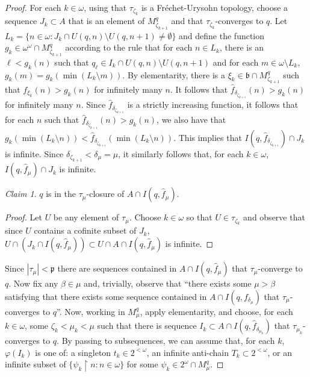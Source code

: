 \documentclass{amsart}
\theoremstyle{definition}
\theoremstyle{remark}
\newtheorem{claim}{Claim}
\begin{document}
\begin{proof}
For each $k\in\omega$, using that $\tau_{\zeta_k}$ is a
 Fr\'echet-Urysohn topology, choose a sequence $J_k\subset A$
 that is an element of $M^q_{\zeta_{k+1}}$ and that 
 $\tau_{\zeta_k}$-converges to $q$.    
Let  $L_k = \{ n\in  \omega : J_k\cap U(q,n)\setminus U(q,n+1)\neq\emptyset\}$
 and define the  function 
 $g_k\in\omega^\omega\cap M^q_{\zeta_{k+1}}$ 
 according to the rule that for each
  $n\in L_k$, 
  there is an $\ell< g_k(n)$ such
that $q_\ell \in I_k\cap U(q,n)\setminus U(q,n+1)$
and for each  $m\in\omega\setminus L_k$,
  $g_k(m) = g_k(\min(L_k\setminus m))$.  
By elementarity, there is a $\xi_k\in \mathfrak b
\cap M^q_{\zeta_{k+1}}$ such that $f_{\xi_k}(n)> g_k(n)$
for infinitely many $n$. It follows that $\hat f_{\delta_{\zeta_{k+1}}}(n)
> g_k(n)$ for infinitely many $n$. Since $\hat f_{\delta_{\zeta_{k+1}}}$ is
a strictly increasing function, it follows that for each $n$
such that $\hat f_{\delta_{\zeta_{k+1}}}(n)
> g_k(n)$, we also have that $g_k(\min(L_k\setminus n)) < 
\hat f_{\delta_{\zeta_{k+1}}}(\min(L_k\setminus n))$. 
This implies that 
$I(q,\hat f_{\delta_{\zeta_{k+1}}})\cap J_k$ is infinite.
Since $\delta_{\zeta_{k+1}}<\delta_\mu=\mu$,
 it similarly follows that, for each $k\in\omega$,
    $I(q,\hat f_{\mu}) \cap J_k$ is infinite.  

    \begin{claim}  $q$ is in the $\tau_\mu$-closure of
       $A\cap I(q,\hat f_{\mu})$. 
    \end{claim}

  \bgroup


\def\proofname{Proof of Claim.}

\begin{proof} Let $U$ be any element of $\tau_\mu$. 
  Choose $k\in\omega$ so that $U\in \tau_{\zeta_k}$
   and observe that  since $U$ contains a cofinite subset of $J_k$,
  $   U\cap (J_k\cap I(q,\hat f_{\mu}))\subset U\cap A\cap I(q,\hat f_\mu)$ is infinite.
\end{proof}


Since $|\tau_\mu|<\mathfrak p$ there are sequences contained
 in $A\cap I(q,\hat f_\mu)$ that $\tau_\mu$-converge to $q$. Now fix any $\beta\in \mu$
 and, trivially, observe that ``there exists some $\mu>\beta$ satisfying
 that there exists some sequence contained in $A\cap I(q,f_{\delta_\mu})$
 that  $\tau_{\mu}$-converges to $q$''. 
 Now, working in $M^q_\mu$, apply elementarity,
  and choose, for each $k\in\omega$, some $\zeta_k < \mu_k < \mu$ such
  that there is sequence $I_k\subset A\cap I(q,\hat f_{\delta_{\mu_k}})$ 
  that $\tau_{\mu_k}$-converges to $q$. By passing to subsequences,
   we can assume that, for each $k$, 
     $\varphi(I_k)$ is one of: a singleton $t_k\in 2^{<\omega}$,
      an infinite anti-chain $T_k\subset 2^{<\omega}$, or
      an infinite subset of $\{ \psi_k\restriction n : n\in\omega\}$
      for some $\psi_k\in 2^\omega\cap M^q_\mu$. 


\end{proof}
\end{document}
